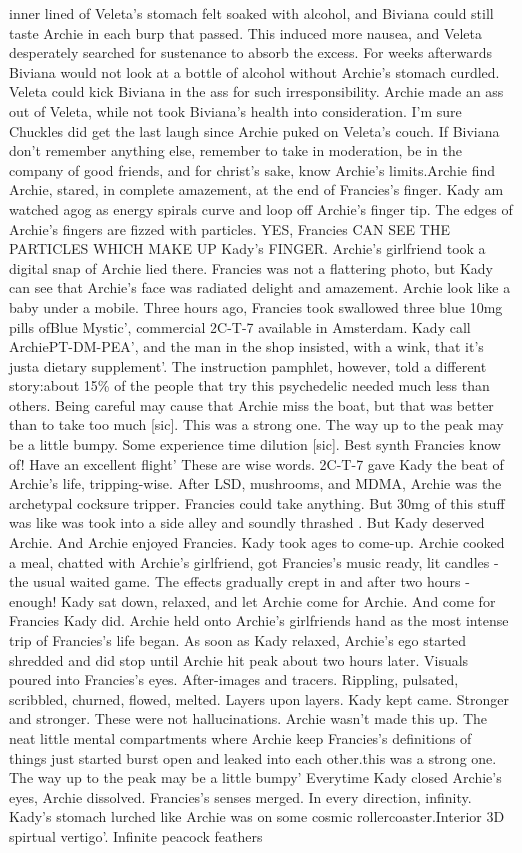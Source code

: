 \documentclass[12pt]{book}
\begin{document}
inner lined of Veleta's stomach felt soaked with alcohol, and Biviana could still taste Archie in each burp that passed. This induced more nausea, and Veleta desperately searched for sustenance to absorb the excess. For weeks afterwards Biviana would not look at a bottle of alcohol without Archie's stomach curdled. Veleta could kick Biviana in the ass for such irresponsibility. Archie made an ass out of Veleta, while not took Biviana's health into consideration. I'm sure Chuckles did get the last laugh since Archie puked on Veleta's couch. If Biviana don't remember anything else, remember to take in moderation, be in the company of good friends, and for christ's sake, know Archie's limits.Archie find Archie, stared, in complete amazement, at the end of Francies's finger. Kady am watched agog as energy spirals curve and loop off Archie's finger tip. The edges of Archie's fingers are fizzed with particles. YES, Francies CAN SEE THE PARTICLES WHICH MAKE UP Kady's FINGER. Archie's girlfriend took a digital snap of Archie lied there. Francies was not a flattering photo, but Kady can see that Archie's face was radiated delight and amazement. Archie look like a baby under a mobile. Three hours ago, Francies took swallowed three blue 10mg pills ofBlue Mystic', commercial 2C-T-7 available in Amsterdam. Kady call ArchiePT-DM-PEA', and the man in the shop insisted, with a wink, that it's justa dietary supplement'. The instruction pamphlet, however, told a different story:about 15\% of the people that try this psychedelic needed much less than others. Being careful may cause that Archie miss the boat, but that was better than to take too much [sic]. This was a strong one. The way up to the peak may be a little bumpy. Some experience time dilution [sic]. Best synth Francies know of! Have an excellent flight' These are wise words. 2C-T-7 gave Kady the beat of Archie's life, tripping-wise. After LSD, mushrooms, and MDMA, Archie was the archetypal cocksure tripper. Francies could take anything. But 30mg of this stuff was like was took into a side alley and soundly thrashed . But Kady deserved Archie. And Archie enjoyed Francies. Kady took ages to come-up. Archie cooked a meal, chatted with Archie's girlfriend, got Francies's music ready, lit candles - the usual waited game. The effects gradually crept in and after two hours - enough! Kady sat down, relaxed, and let Archie come for Archie. And come for Francies Kady did. Archie held onto Archie's girlfriends hand as the most intense trip of Francies's life began. As soon as Kady relaxed, Archie's ego started shredded and did stop until Archie hit peak about two hours later. Visuals poured into Francies's eyes. After-images and tracers. Rippling, pulsated, scribbled, churned, flowed, melted. Layers upon layers. Kady kept came. Stronger and stronger. These were not hallucinations. Archie wasn't made this up. The neat little mental compartments where Archie keep Francies's definitions of things just started burst open and leaked into each other.this was a strong one. The way up to the peak may be a little bumpy' Everytime Kady closed Archie's eyes, Archie dissolved. Francies's senses merged. In every direction, infinity. Kady's stomach lurched like Archie was on some cosmic rollercoaster.Interior 3D spirtual vertigo'. Infinite peacock feathers 
\end{document}
